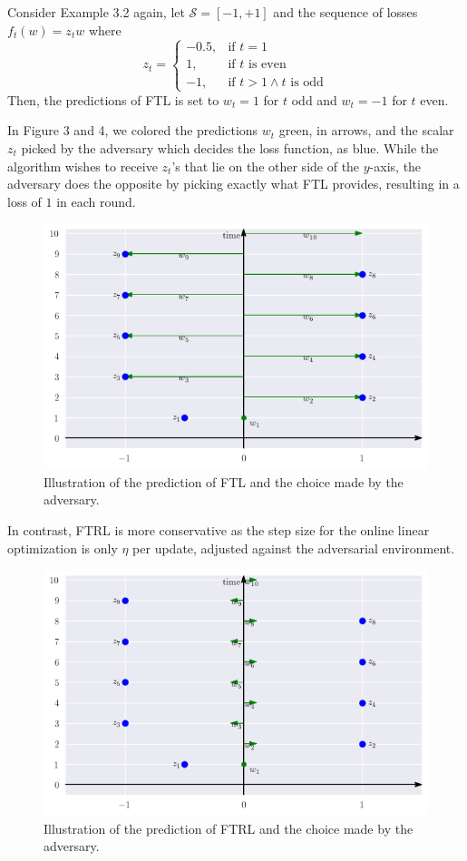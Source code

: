 \documentclass{article}
\begin{document}
Consider Example 3.2 again, let $\mathcal{S}=[-1,+1]$ and the sequence of losses $f_t(w)=z_t w$ where \[z_t=\begin{cases}-0.5, &\text{if }t=1\\1, &\text{if }t\text{ is even}\\-1, &\text{if }t>1 \wedge t\text{ is odd}\end{cases}\] Then, the predictions of FTL is set to $w_t=1$ for $t$ odd and $w_t=-1$ for $t$ even.

In Figure 3 and 4, we colored the predictions $w_t$ green, in arrows, and the scalar $z_t$ picked by the adversary which decides the loss function, as blue. While the algorithm wishes to receive $z_t$'s that lie on the other side of the $y$-axis, the adversary does the opposite by picking exactly what FTL provides, resulting in a loss of $1$ in each round.

\begin{figure}[H]
  \centering
  \includegraphics[width=0.5\linewidth]{../FTL_demo.png}
  \caption{Illustration of the prediction of FTL and the choice made by the adversary.}
\end{figure}

In contrast, FTRL is more conservative as the step size for the online linear optimization is only $\eta$ per update, adjusted against the adversarial environment.

\begin{figure}[H]
  \centering
  \includegraphics[width=0.5\linewidth]{../FTRL_demo.png}
  \caption{Illustration of the prediction of FTRL and the choice made by the adversary.}
\end{figure}
\end{document}
